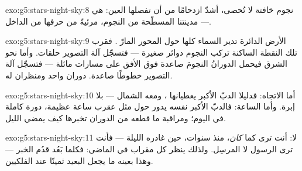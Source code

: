 \begin{solution}{exo:g5:stars-night-sky:8}
نجوم خافتة لا تُحصى، أشدّ ازدحامًا من أن تفصلها العين: هي  --- مدينتنا المسطّحة من النجوم، مرئيةً من حرفها من
الداخل.
\end{solution}

\begin{solution}{exo:g5:stars-night-sky:9}
الأرض الدائرة تدير السماء كلها حول المحور المارّ . فقرب تلك النقطة الساكنة تركب النجوم دوائر صغيرة ---
فتسجّل آلة التصوير حلقات. وأما نحو الشرق فيحمل الدورانُ النجومَ
صاعدة فوق الأفق على مسارات مائلة --- فتسجّل آلة التصوير خطوطًا
صاعدة. دوران واحد ومنظران له.
\end{solution}

\begin{solution}{exo:g5:stars-night-sky:10}
أما الاتجاه: فدليلا الدبّ الأكبر يعطيانها ، ومعه
الشمال --- بلا إبرة. وأما الساعة: فالدبّ الأكبر نفسه يدور حول
 مثل عقرب ساعة عظيمة، دورة كاملة في اليوم؛ ومراقبة
ما قطعه من الدوران تخبرها كيف يمضي الليل.
\end{solution}

\begin{solution}{exo:g5:stars-night-sky:11}
لا: أنت ترى  كما \emph{كان}، منذ سنوات، حين غادره 
الليلة --- فأنت ترى الرسول لا المرسِل. ولذلك ينظر كل مقراب في
الماضي: فكلما بَعُد  قدُم الخبر --- وهذا بعينه ما يجعل
 البعيد ثمينًا عند الفلكيين.
\end{solution}
